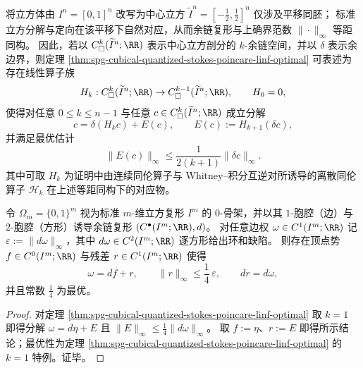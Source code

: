 \begin{remark}[中心立方与立方余链记号的等价改写]\label{rem:spg-cubical-centered-csquare-rewrite}
将立方体由 \(I^n=[0,1]^n\) 改写为中心立方 \(\widetilde I^n=[-\tfrac12,\tfrac12]^n\) 仅涉及平移同胚；
标准立方分解与定向在该平移下自然对应，从而余链复形与上确界范数 \(\|\cdot\|_\infty\) 等距同构。
因此，若以 \(C^k_{\square}(\widetilde I^n;\RR)\) 表示中心立方剖分的 \(k\)-余链空间，并以 \(\delta\) 表示余边界，则定理 \ref{thm:spg-cubical-quantized-stokes-poincare-linf-optimal} 可表述为存在线性算子族
\[
H_k:C^k_{\square}(\widetilde I^n;\RR)\to C^{k-1}_{\square}(\widetilde I^n;\RR),\qquad H_0=0,
\]
使得对任意 \(0\le k\le n-1\) 与任意 \(c\in C^k_{\square}(\widetilde I^n;\RR)\) 成立分解
\[
c=\delta(H_kc)+E(c),\qquad E(c):=H_{k+1}(\delta c),
\]
并满足最优估计
\[
\|E(c)\|_\infty\le \frac{1}{2(k+1)}\|\delta c\|_\infty.
\]
其中可取 \(H_k\) 为证明中由连续同伦算子与 Whitney--积分互逆对所诱导的离散同伦算子 \(\mathcal H_k\) 在上述等距同构下的对应物。
\end{remark}

\begin{corollary}[超立方体图上的势一致化与方形缺陷的最优线性控制]\label{cor:spg-hypercube-gradient-consistency-by-square-defect}
令 \(\Omega_m=\{0,1\}^m\) 视为标准 \(m\)-维立方复形 \(I^m\) 的 \(0\)-骨架，并以其 \(1\)-胞腔（边）与 \(2\)-胞腔（方形）诱导余链复形 \((C^\bullet(I^m;\RR),d)\)。
对任意边权 \(\omega\in C^1(I^m;\RR)\) 记
\(
\varepsilon:=\|d\omega\|_\infty
\)，其中 \(d\omega\in C^2(I^m;\RR)\) 逐方形给出环和缺陷。
则存在顶点势 \(f\in C^0(I^m;\RR)\) 与残差 \(r\in C^1(I^m;\RR)\) 使得
\[
\omega=df+r,\qquad \|r\|_\infty\le \frac14\,\varepsilon,
\qquad dr=d\omega,
\]
并且常数 \(\frac14\) 为最优。
\end{corollary}
\begin{proof}
对定理 \ref{thm:spg-cubical-quantized-stokes-poincare-linf-optimal} 取 \(k=1\) 即得分解 \(\omega=d\eta+E\) 且 \(\|E\|_\infty\le \frac14\|d\omega\|_\infty\)。
取 \(f:=\eta\)、\(r:=E\) 即得所示结论；最优性为定理 \ref{thm:spg-cubical-quantized-stokes-poincare-linf-optimal} 的 \(k=1\) 特例。证毕。
\end{proof}

